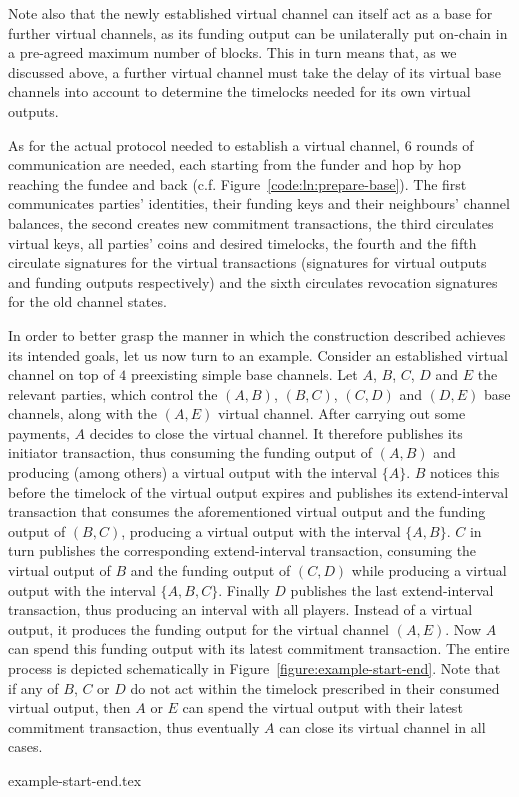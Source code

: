   Note also that the newly established virtual channel can itself act as a base
  for further virtual channels, as its funding output can be unilaterally put
  on-chain in a pre-agreed maximum number of blocks. This in turn means that, as
  we discussed above, a further virtual channel must take the delay of its
  virtual base channels into account to determine the timelocks needed for its
  own virtual outputs.

  As for the actual protocol needed to establish a virtual channel, $6$ rounds
  of communication are needed, each starting from the funder and hop by hop reaching
  the fundee and back (c.f. Figure~\ref{code:ln:prepare-base}). The first communicates
  parties' identities, their funding keys and their neighbours' channel
  balances, the second creates new commitment transactions, the third circulates
  virtual keys, all parties' coins and desired timelocks, the fourth and the
  fifth circulate signatures for the virtual transactions (signatures for
  virtual outputs and funding outputs respectively) and the sixth circulates
  revocation signatures for the old channel states.

  In order to better grasp the manner in which the construction described
  achieves its intended goals, let us now turn to an example. Consider an
  established virtual channel on top of $4$ preexisting simple base channels.
  Let $A$, $B$, $C$, $D$ and $E$ the relevant parties, which control the $(A,
  B)$, $(B, C)$, $(C, D)$ and $(D, E)$ base channels, along with the $(A, E)$
  virtual channel. After carrying out some payments, $A$ decides to close the
  virtual channel. It therefore publishes its initiator transaction, thus
  consuming the funding output of $(A, B)$ and producing (among others) a
  virtual output with the interval $\{A\}$. $B$ notices this before the timelock
  of the virtual output expires and publishes its extend-interval
  transaction that consumes the aforementioned virtual output and the funding
  output of $(B, C)$, producing a virtual output with the interval $\{A, B\}$.
  $C$ in turn publishes the corresponding extend-interval transaction, consuming
  the virtual output of $B$ and the funding output of $(C, D)$ while producing a
  virtual output with the interval $\{A, B, C\}$. Finally $D$ publishes the last
  extend-interval transaction, thus producing an interval with all players.
  Instead of a virtual output, it produces the funding output for the virtual
  channel $(A, E)$. Now $A$ can spend this funding output with its latest
  commitment transaction. The entire process is depicted schematically in
  Figure~\ref{figure:example-start-end}. Note that if any of $B$, $C$ or $D$ do
  not act within the timelock prescribed in their consumed virtual output, then
  $A$ or $E$ can spend the virtual output with their latest commitment
  transaction, thus eventually $A$ can close its virtual channel in all cases.

  \begin{figure*}
    {example-start-end.tex}
    \caption{$4$ simple channels supporting a virtual. $A$ initiates the closing
    procedure and no party is negligent.}
    \label{figure:example-start-end}
  \end{figure*}
